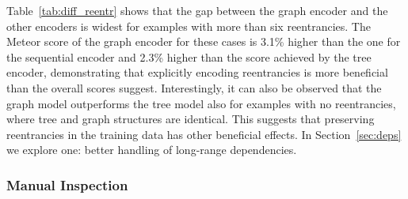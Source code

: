 \documentclass[11pt,a4paper]{article}
\begin{document}
Table~\ref{tab:diff_reentr} shows that the gap between the graph encoder and the other encoders is widest for examples with more than six reentrancies. The Meteor score of the graph encoder for these cases is 3.1\% higher than the one for the sequential encoder and 2.3\% higher than the score achieved by the tree encoder, demonstrating that explicitly encoding reentrancies is more beneficial than the overall scores suggest. Interestingly, it can also be observed that the graph model outperforms the tree model also for examples with no reentrancies, where tree and graph structures are identical. This suggests that preserving reentrancies in the training data has other beneficial effects. In Section~\ref{sec:deps} we explore one: better handling of long-range dependencies.


\subsubsection{Manual Inspection}
\end{document}
